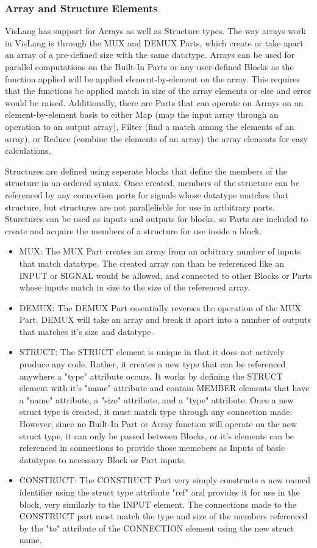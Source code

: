 \subsubsection{Array and Structure Elements}
VisLang has support for Arrays as well as Structure types.
The way arrays work in VisLang is through the MUX and DEMUX Parts, which create or take apart an array of a pre-defined size with the same datatype.
Arrays can be used for parallel computations on the Built-In Parts or any user-defined Blocks as the function applied will be applied element-by-element on the array.
This requires that the functions be applied match in size of the array elements or else and error would be raised.
Additionally, there are Parts that can operate on Arrays on an element-by-element basis to either Map (map the input array through an operation to an output array), Filter (find a match among the elements of an array), or Reduce (combine the elements of an array) the array elements for easy calculations.
\par
Structures are defined using seperate blocks that define the members of the structure in an ordered syntax.
Once created, members of the structure can be referenced by any connection parts for signals whose datatype matches that structure, but structures are not parallelisble for use in artbitrary parts.
Sturctures can be used as inputs and outputs for blocks, so Parts are included to create and acquire the members of a structure for use inside a block.
\begin{itemize}[label={}]
    \item MUX:
The MUX Part creates an array from an arbitrary number of inputs that match datatype.
The created array can than be referenced like an INPUT or SIGNAL would be allowed, and connected to other Blocks or Parts whose inputs match in size to the size of the referenced array.
    \item DEMUX:
The DEMUX Part essentially reverses the operation of the MUX Part.
DEMUX will take an array and break it apart into a number of outputs that matches it's size and datatype.
    \item STRUCT:
The STRUCT element is unique in that it does not actively produce any code.
Rather, it creates a new type that can be referenced anywhere a "type" attribute occurs.
It works by defining the STRUCT element with it's "name" attribute and contain MEMBER elements that have a "name" attribute, a "size" attribute, and a "type" attribute.
Once a new struct type is created, it must match type through any connection made.
However, since no Built-In Part or Array function will operate on the new struct type, it can only be passed between Blocks, or it's elements can be referenced in connections to provide those memebers as Inputs of basic datatypes to necessary Block or Part inputs.
    \item CONSTRUCT:
The CONSTRUCT Part very simply constructs a new named identifier using the struct type  attribute "ref" and provides it for use in the block, very similarly to the INPUT element.
The connections made to the CONSTRUCT part must match the type and size of the members referenced by the "to" attribute of the CONNECTION element using the new struct name.
\end{itemize}
